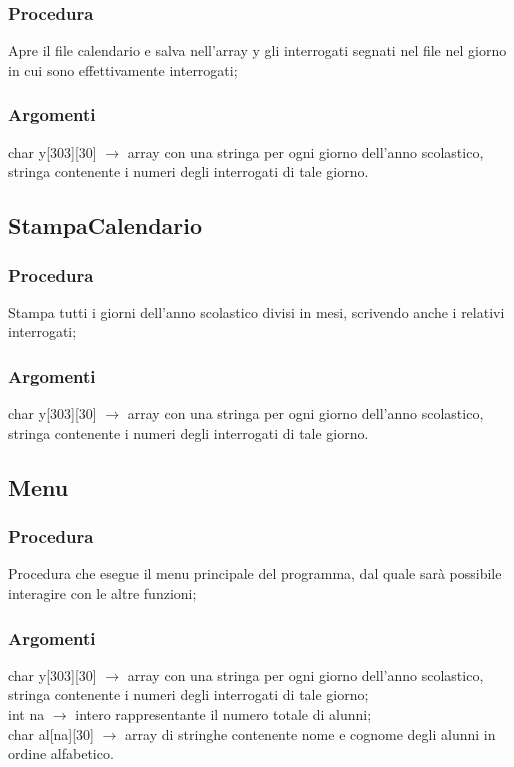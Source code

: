 \documentclass[14pt]{extarticle}
\begin{document}
\subsubsection*{Procedura}
Apre il file calendario e salva nell'array y gli interrogati segnati nel file nel giorno in cui sono effettivamente interrogati;
\subsubsection*{Argomenti}
char y[303][30] $\longrightarrow$ array con una stringa per ogni giorno dell'anno scolastico, stringa contenente i numeri degli interrogati di tale giorno.
\vspace{50px}
\subsection{StampaCalendario}
\subsubsection*{Procedura}
Stampa tutti i giorni dell'anno scolastico divisi in mesi, scrivendo anche i relativi interrogati;
\subsubsection*{Argomenti}
char y[303][30] $\longrightarrow$ array con una stringa per ogni giorno dell'anno scolastico, stringa contenente i numeri degli interrogati di tale giorno.
\vspace{50px}
\subsection{Menu}
\subsubsection*{Procedura}
Procedura che esegue il menu principale del programma, dal quale sarà possibile interagire con le altre funzioni;
\subsubsection*{Argomenti}
char y[303][30] $\longrightarrow$ array con una stringa per ogni giorno dell'anno scolastico, stringa contenente i numeri degli interrogati di tale giorno;
\\int na $\longrightarrow$ intero rappresentante il numero totale di alunni; 
\\char al[na][30] $\longrightarrow$ array di stringhe contenente nome e cognome degli alunni in ordine alfabetico.
\vspace{50px}
\end{document}
